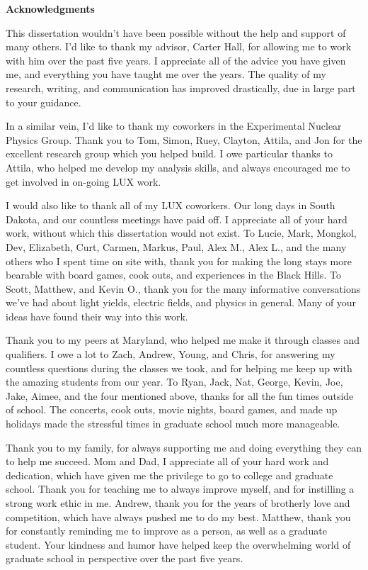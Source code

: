 \newpage
\thispagestyle{plain}
    
    \Large
    \textbf{Acknowledgments}

	\vspace{1cm}

	\normalsize

    This dissertation wouldn't have been possible without the help and support of many others.  I'd like to thank my advisor, Carter Hall, for allowing me to work with him over the past five years.  I appreciate all of the advice you have given me, and everything you have taught me over the years.  The quality of my research, writing, and communication has improved drastically, due in large part to your guidance.

In a similar vein, I'd like to thank my coworkers in the Experimental Nuclear Physics Group.  Thank you to Tom, Simon, Ruey, Clayton, Attila, and Jon for the excellent research group which you helped build.  I owe particular thanks to Attila,  who helped me develop my analysis skills, and always encouraged me to get involved in on-going LUX work. 
    
I would also like to thank all of my LUX coworkers.  Our long days in South Dakota, and our countless meetings have paid off.  I appreciate all of your hard work, without which this dissertation would not exist.  To Lucie, Mark, Mongkol, Dev, Elizabeth, Curt, Carmen, Markus, Paul, Alex M., Alex L., and the many others who I spent time on site with, thank you for making the long stays more bearable with board games, cook outs, and experiences in the Black Hills.  To Scott, Matthew, and Kevin O., thank you for the many informative conversations we've had about light yields, electric fields, and physics in general.  Many of your ideas have found their way into this work.

Thank you to my peers at Maryland, who helped me make it through classes and qualifiers.  I owe a lot to Zach, Andrew, Young, and Chris, for answering my countless questions during the classes we took, and for helping me keep up with the amazing students from our year.  To Ryan, Jack, Nat, George, Kevin, Joe, Jake, Aimee, and the four mentioned above, thanks for all the fun times outside of school.  The concerts, cook outs, movie nights, board games, and made up holidays made the stressful times in graduate school much more manageable.  

Thank you to my family, for always supporting me and doing everything they can to help me succeed.  Mom and Dad, I appreciate all of your hard work and dedication, which have given me the privilege to go to college and graduate school.  Thank you for teaching me to always improve myself, and for instilling a strong work ethic in me.  Andrew, thank you for the years of brotherly love and competition, which have always pushed me to do my best.  Matthew, thank you for constantly reminding me to improve as a person, as well as a graduate student.  Your kindness and humor have helped keep the overwhelming world of graduate school in perspective over the past five years.
 
